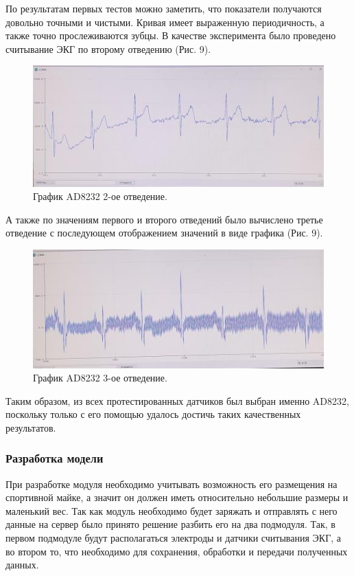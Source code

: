 \documentclass[12pt, russian]{extarticle}
\begin{document}
\begin{spacing}{1.5}
По результатам первых тестов можно заметить, что показатели получаются довольно точными и чистыми. Кривая имеет выраженную периодичность, а также точно прослеживаются зубцы. В качестве эксперимента было проведено считывание ЭКГ по второму отведению (Рис. 9).

\begin{figure}[htbp]
\centering
\includegraphics[scale=0.8]{resources/ad8232/2е-отведение.jpg}
\caption{График AD8232 2-ое отведение.}
\label{fig:my_label}
\end{figure}

А также по значениям первого и второго отведений было вычислено третье отведение с последующем отображением значений в виде графика (Рис. 9).

\begin{figure}[htbp]
\centering
\includegraphics[scale=0.8]{resources/ad8232/3е-отведение.jpg}
\caption{График AD8232 3-ое отведение.}
\label{fig:my_label}
\end{figure}

Таким образом, из всех протестированных датчиков был выбран именно AD8232, поскольку только с его помощью удалось достичь таких качественных результатов.

\subsubsection{Разработка модели}

При разработке модуля необходимо учитывать возможность его размещения на спортивной майке, а значит он должен иметь относительно небольшие размеры и маленький вес. Так как модуль необходимо будет заряжать и отправлять с него данные на сервер было принято решение разбить его на два подмодуля. Так, в первом подмодуле будут располагаться электроды и датчики считывания ЭКГ, а во втором то, что необходимо для сохранения, обработки и передачи полученных данных.


\end{spacing}
\end{document}
